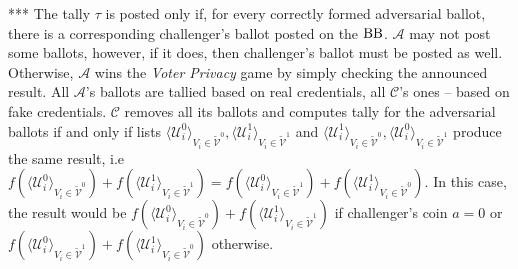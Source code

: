*** The tally $\tau$ is posted only if, for every correctly formed adversarial ballot, there is a corresponding challenger's ballot posted on the $\operatorname{BB}$. $\mathcal{A}$ may not post some ballots, however, if it does, then challenger's ballot must be posted as well. Otherwise, $\mathcal{A}$ wins the \textit{Voter Privacy} game by simply checking the announced result.  All $\mathcal{A}$'s ballots are tallied based on real credentials, all  $\mathcal{C}$'s ones -- based on fake credentials.  $\mathcal{C}$ removes all its ballots and computes tally for the adversarial ballots if and only if lists $\langle \mathcal{U}^0_i \rangle _{V_i \in \tilde{\mathcal{V}}^0}, \langle \mathcal{U}^1_i \rangle _{V_i \in \tilde{\mathcal{V}}^1}$ and $\langle \mathcal{U}^1_i \rangle _{V_i \in \tilde{\mathcal{V}}^0}, \langle \mathcal{U}^0_i \rangle _{V_i \in \tilde{\mathcal{V}}^1}$ produce the same result, i.e $f(\langle \mathcal{U}^0_i \rangle _{V_i \in \tilde{\mathcal{V}}^0} ) + f(\langle \mathcal{U}^1_i \rangle _{V_i \in \tilde{\mathcal{V}}^1} ) =  f(\langle \mathcal{U}^0_i \rangle _{V_i \in \tilde{\mathcal{V}}^1} ) +  f(\langle \mathcal{U}^1_i \rangle _{V_i \in \tilde{\mathcal{V}}^0} )$. In this case, the result would be $f(\langle \mathcal{U}^0_i \rangle _{V_i \in \tilde{\mathcal{V}}^0} ) + f(\langle \mathcal{U}^1_i \rangle _{V_i \in \tilde{\mathcal{V}}^1} )$ if challenger's coin $a=0$ or  $f(\langle \mathcal{U}^0_i \rangle _{V_i \in \tilde{\mathcal{V}}^1} ) +  f(\langle \mathcal{U}^1_i \rangle _{V_i \in \tilde{\mathcal{V}}^0} )$ otherwise.\\

